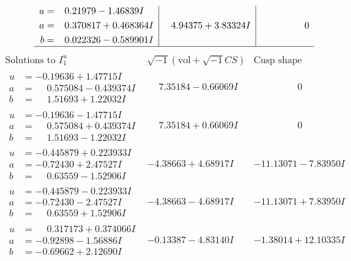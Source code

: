 \documentclass[1p]{elsarticle_modified}
\theoremstyle{definition}
\newcommand{\I}{\sqrt{-1}}
\begin{document}
$$\begin{array}{c|c|c}
\begin{aligned}
u &= \phantom{-}0.21979 - 1.46839 I \\
a &= \phantom{-}0.370817 + 0.468364 I \\
b &= \phantom{-}0.022326 - 0.589901 I\end{aligned}
 & \phantom{-}4.94375 + 3.83324 I & \phantom{-0.000000 } 0\\
 \hline 
 \end{array}$$\newpage$$\begin{array}{c|c|c}  
\text{Solutions to }I^u_{1}& \I (\text{vol} + \sqrt{-1}CS) & \text{Cusp shape}\\
 \hline 
\begin{aligned}
u &= -0.19636 + 1.47715 I \\
a &= \phantom{-}0.575084 - 0.439374 I \\
b &= \phantom{-}1.51693 + 1.22032 I\end{aligned}
 & \phantom{-}7.35184 - 0.66069 I & \phantom{-0.000000 } 0 \\ \hline\begin{aligned}
u &= -0.19636 - 1.47715 I \\
a &= \phantom{-}0.575084 + 0.439374 I \\
b &= \phantom{-}1.51693 - 1.22032 I\end{aligned}
 & \phantom{-}7.35184 + 0.66069 I & \phantom{-0.000000 } 0 \\ \hline\begin{aligned}
u &= -0.445879 + 0.223933 I \\
a &= -0.72430 + 2.47527 I \\
b &= \phantom{-}0.63559 - 1.52906 I\end{aligned}
 & -4.38663 + 4.68917 I & -11.13071 - 7.83950 I \\ \hline\begin{aligned}
u &= -0.445879 - 0.223933 I \\
a &= -0.72430 - 2.47527 I \\
b &= \phantom{-}0.63559 + 1.52906 I\end{aligned}
 & -4.38663 - 4.68917 I & -11.13071 + 7.83950 I \\ \hline\begin{aligned}
u &= \phantom{-}0.317173 + 0.374066 I \\
a &= -0.92898 - 1.56886 I \\
b &= -0.69662 + 2.12690 I\end{aligned}
 & -0.13387 - 4.83140 I & -1.38014 + 12.10335 I \\ \hline\begin{aligned}

\end{aligned}
\end{array}$$
\end{document}

